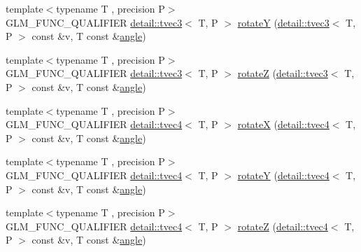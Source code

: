 \begin{DoxyCompactItemize}
\item 
{\footnotesize template$<$typename T , precision P$>$ }\\G\+L\+M\+\_\+\+F\+U\+N\+C\+\_\+\+Q\+U\+A\+L\+I\+F\+I\+ER \hyperlink{structglm_1_1detail_1_1tvec3}{detail\+::tvec3}$<$ T, P $>$ \hyperlink{group__gtx__rotate__vector_gae1e673b7a464218ce6a5e8f02145f877}{rotateY} (\hyperlink{structglm_1_1detail_1_1tvec3}{detail\+::tvec3}$<$ T, P $>$ const \&v, T const \&\hyperlink{group__gtc__quaternion_ga23a3fc7ada5bbb665ff84c92c6e0542c}{angle})
\item 
{\footnotesize template$<$typename T , precision P$>$ }\\G\+L\+M\+\_\+\+F\+U\+N\+C\+\_\+\+Q\+U\+A\+L\+I\+F\+I\+ER \hyperlink{structglm_1_1detail_1_1tvec3}{detail\+::tvec3}$<$ T, P $>$ \hyperlink{group__gtx__rotate__vector_gae5c27548f86f1e95f76a87cf16f512da}{rotateZ} (\hyperlink{structglm_1_1detail_1_1tvec3}{detail\+::tvec3}$<$ T, P $>$ const \&v, T const \&\hyperlink{group__gtc__quaternion_ga23a3fc7ada5bbb665ff84c92c6e0542c}{angle})
\item 
{\footnotesize template$<$typename T , precision P$>$ }\\G\+L\+M\+\_\+\+F\+U\+N\+C\+\_\+\+Q\+U\+A\+L\+I\+F\+I\+ER \hyperlink{structglm_1_1detail_1_1tvec4}{detail\+::tvec4}$<$ T, P $>$ \hyperlink{group__gtx__rotate__vector_gaa0db2d8b73f86d7bfdf2bface4056e88}{rotateX} (\hyperlink{structglm_1_1detail_1_1tvec4}{detail\+::tvec4}$<$ T, P $>$ const \&v, T const \&\hyperlink{group__gtc__quaternion_ga23a3fc7ada5bbb665ff84c92c6e0542c}{angle})
\item 
{\footnotesize template$<$typename T , precision P$>$ }\\G\+L\+M\+\_\+\+F\+U\+N\+C\+\_\+\+Q\+U\+A\+L\+I\+F\+I\+ER \hyperlink{structglm_1_1detail_1_1tvec4}{detail\+::tvec4}$<$ T, P $>$ \hyperlink{group__gtx__rotate__vector_gae48a26ac0e3670ad2486858bf2a8e90b}{rotateY} (\hyperlink{structglm_1_1detail_1_1tvec4}{detail\+::tvec4}$<$ T, P $>$ const \&v, T const \&\hyperlink{group__gtc__quaternion_ga23a3fc7ada5bbb665ff84c92c6e0542c}{angle})
\item 
{\footnotesize template$<$typename T , precision P$>$ }\\G\+L\+M\+\_\+\+F\+U\+N\+C\+\_\+\+Q\+U\+A\+L\+I\+F\+I\+ER \hyperlink{structglm_1_1detail_1_1tvec4}{detail\+::tvec4}$<$ T, P $>$ \hyperlink{group__gtx__rotate__vector_ga1db5137be16ed5d375038e06707ac52b}{rotateZ} (\hyperlink{structglm_1_1detail_1_1tvec4}{detail\+::tvec4}$<$ T, P $>$ const \&v, T const \&\hyperlink{group__gtc__quaternion_ga23a3fc7ada5bbb665ff84c92c6e0542c}{angle})

\end{DoxyCompactItemize}
